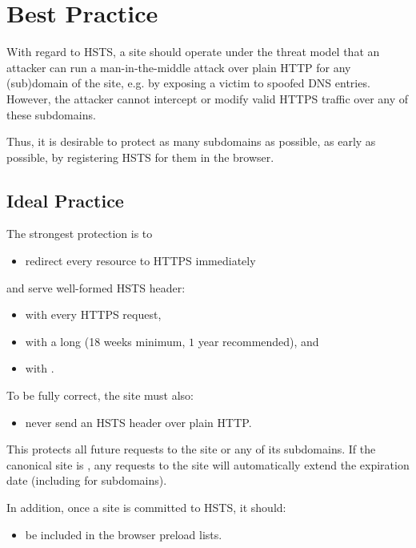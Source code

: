 \documentclass{acm_proc_article-sp}
\begin{document}
\section{Best Practice}

With regard to HSTS, a site should operate under the threat model that an attacker can run a man-in-the-middle attack over plain HTTP for any (sub)domain of the site, e.g. by exposing a victim to spoofed DNS entries. However, the attacker cannot intercept or modify valid HTTPS traffic over any of these subdomains.

Thus, it is desirable to protect as many subdomains as possible, as early as possible, by registering HSTS for them in the browser.

\subsection{Ideal Practice}


The strongest protection is to

\begin{itemize}
\item redirect every resource to HTTPS immediately
\end{itemize}

and serve well-formed  HSTS header:

\begin{itemize}
\item with every HTTPS request,
\item with a long  (18 weeks minimum, $1$ year recommended), and
\item with {\iSD}.
\end{itemize}

To be fully correct, the site must also:

\begin{itemize}
\item never send an HSTS header over plain HTTP.
\end{itemize}

This protects all future requests to the site or any of its subdomains. If the canonical site is {\s}, any requests to the site will automatically extend the expiration date (including for subdomains).

In addition, once a site is committed to HSTS, it should:
\begin{itemize}
\item be included in the browser preload lists.
\end{itemize}
\end{document}

